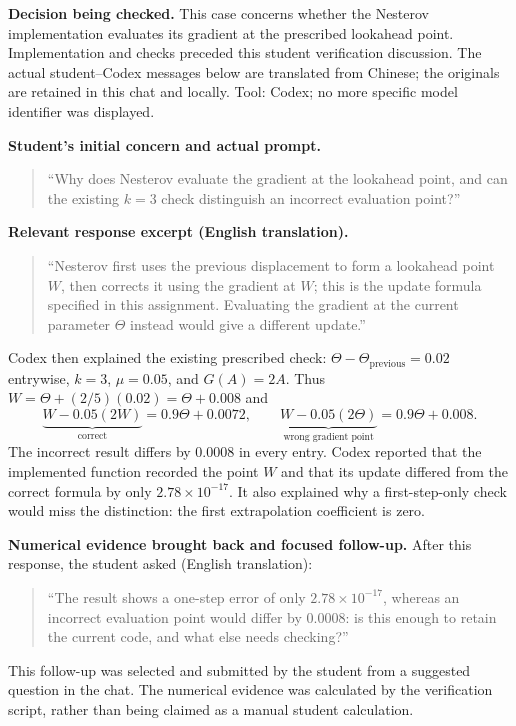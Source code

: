 \textbf{Decision being checked.} This case concerns whether the Nesterov implementation evaluates its gradient at the prescribed lookahead point. Implementation and checks preceded this student verification discussion. The actual student--Codex messages below are translated from Chinese; the originals are retained in this chat and locally. Tool: Codex; no more specific model identifier was displayed.

\textbf{Student's initial concern and actual prompt.}
\begin{quote}\small
``Why does Nesterov evaluate the gradient at the lookahead point, and can the existing $k=3$ check distinguish an incorrect evaluation point?''
\end{quote}

\textbf{Relevant response excerpt (English translation).}
\begin{quote}\small
``Nesterov first uses the previous displacement to form a lookahead point $W$, then corrects it using the gradient at $W$; this is the update formula specified in this assignment. Evaluating the gradient at the current parameter $\Theta$ instead would give a different update.''
\end{quote}
Codex then explained the existing prescribed check: $\Theta-\Theta_{\mathrm{previous}}=0.02$ entrywise, $k=3$, $\mu=0.05$, and $G(A)=2A$. Thus $W=\Theta+(2/5)(0.02)=\Theta+0.008$ and
\[
\underbrace{W-0.05(2W)}_{\text{correct}}=0.9\Theta+0.0072,\qquad
\underbrace{W-0.05(2\Theta)}_{\text{wrong gradient point}}=0.9\Theta+0.008.
\]
The incorrect result differs by $0.0008$ in every entry. Codex reported that the implemented function recorded the point $W$ and that its update differed from the correct formula by only $2.78\times10^{-17}$. It also explained why a first-step-only check would miss the distinction: the first extrapolation coefficient is zero.

\textbf{Numerical evidence brought back and focused follow-up.} After this response, the student asked (English translation):
\begin{quote}\small
``The result shows a one-step error of only $2.78\times10^{-17}$, whereas an incorrect evaluation point would differ by $0.0008$: is this enough to retain the current code, and what else needs checking?''
\end{quote}
This follow-up was selected and submitted by the student from a suggested question in the chat. The numerical evidence was calculated by the verification script, rather than being claimed as a manual student calculation.

